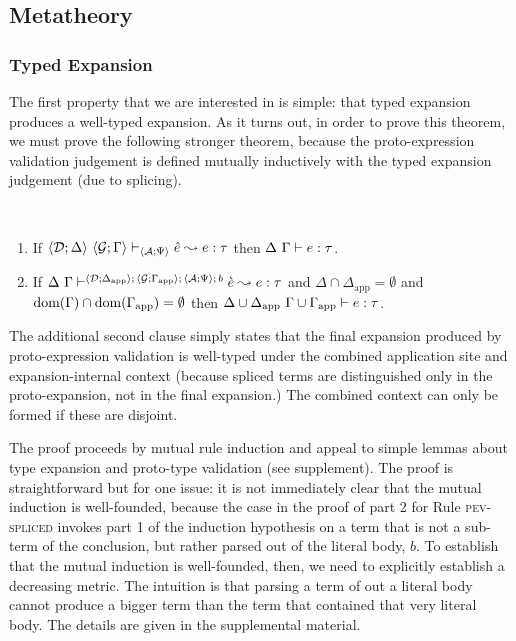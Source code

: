 \documentclass[acmsmall,review,anonymous]{acmart}\settopmatter{printfolios=true,printccs=false,printacmref=false}
\begin{document}
\subsection{Metatheory}\label{sec:s-metatheory}

\subsubsection{Typed Expansion} The first property that we are interested in is simple: that typed expansion produces a well-typed expansion. As it turns out, in order to prove this theorem, we must  prove the following stronger theorem, because the proto-expression validation judgement is defined mutually inductively with the typed expansion judgement (due to splicing).

\begin{theorem} ~
\begin{enumerate}[nolistsep]
\item If $\langle \mathcal{D}; \Delta \rangle~\langle \mathcal{G}; \Gamma \rangle \vdash_{\langle \mathcal{A}; \Psi \rangle} {\hat e} \leadsto e : \tau$ then $\Delta~\Gamma \vdash e : \tau$.
\item If $\Delta~\Gamma\vdash^{\langle \mathcal{D}; \Delta_\text{app} \rangle;\,\langle \mathcal{G}; \Gamma_\text{app} \rangle;\,\langle \mathcal{A}; \Psi \rangle;\,b} \grave{e} \leadsto e : \tau$ and $\Delta \cap \Delta_\text{app} = \emptyset$ and $\text{dom}(\Gamma) \cap \text{dom}(\Gamma_\text{app}) = \emptyset$ then ${\Delta}\cup{\Delta_\text{app}}~{\Gamma}\cup{\Gamma_\text{app}} \vdash e : \tau$.
\end{enumerate}
\end{theorem}

The additional second clause simply states that the final expansion produced by proto-expression validation is well-typed under the combined application site and expansion-internal context (because spliced terms are distinguished only in the proto-expansion, not in the final expansion.) The combined context can only be formed if these are disjoint.

The proof proceeds by mutual rule induction and appeal to simple lemmas about type expansion and proto-type validation (see supplement). The proof is straightforward but for one issue: it is not immediately clear that the mutual induction is well-founded, because the case in the proof of part 2 for Rule \textsc{pev-spliced} invokes part 1 of the induction hypothesis on a term that is not a sub-term of the conclusion, but rather parsed out of the literal body, $b$. To establish that the mutual induction is well-founded, then, we need to explicitly establish a decreasing metric. The intuition is that parsing a term of out a literal body cannot produce a bigger term than the term that contained that very literal body. 
The details are given in the supplemental material.
\end{document}
